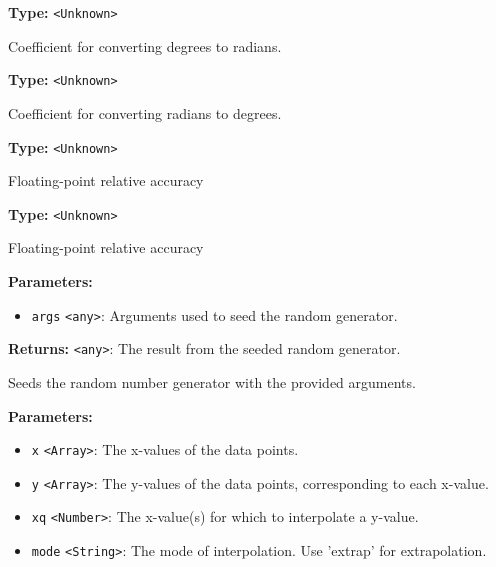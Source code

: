 \documentclass[12pt,a4paper]{article}
\begin{document}
\noindent \textbf{Type:} \texttt{<Unknown>}

\noindent Coefficient for converting degrees to radians.

\vspace{5mm}
\noindent {}\vspace{4mm}


\noindent \textbf{Type:} \texttt{<Unknown>}

\noindent Coefficient for converting radians to degrees.

\vspace{5mm}
\noindent {}\vspace{4mm}


\noindent \textbf{Type:} \texttt{<Unknown>}

\noindent Floating-point relative accuracy

\vspace{5mm}
\noindent {}\vspace{4mm}


\noindent \textbf{Type:} \texttt{<Unknown>}

\noindent Floating-point relative accuracy

\vspace{5mm}
\noindent {}


\noindent \textbf{Parameters:}
\begin{itemize}
  \item \texttt{args} \texttt{<any>}: Arguments used to seed the random generator.
\end{itemize}

\noindent \textbf{Returns:} \texttt{<any>}: The result from the seeded random generator.

\noindent Seeds the random number generator with the provided arguments.

\vspace{5mm}
\noindent {}


\noindent \textbf{Parameters:}
\begin{itemize}
  \item \texttt{x} \texttt{<Array>}: The x-values of the data points.
  \item \texttt{y} \texttt{<Array>}: The y-values of the data points, corresponding to each x-value.
  \item \texttt{xq} \texttt{<Number>}: The x-value(s) for which to interpolate a y-value.
  \item \texttt{mode} \texttt{<String>}: The mode of interpolation. Use 'extrap' for extrapolation.
\end{itemize}
\end{document}

